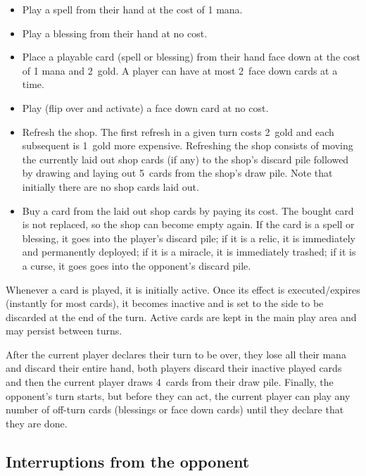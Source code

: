 \documentclass[dvipsnames,parskip,a4paper]{scrartcl}
\newcommand{\facedowncost}{2}
\newcommand{\refreshcost}{2}
\newcommand{\refreshcostincrease}{1}
\newcommand{\handsize}{4}
\newcommand{\facedownsize}{2}
\newcommand{\shopsize}{5}
\begin{document}
\begin{itemize}
\item Play a spell from their hand at the cost of 1 mana.
\item Play a blessing from their hand at no cost.
\item Place a playable card (spell or blessing) from their hand face down at the cost of 1 mana and \facedowncost \ gold. A player can have at most \facedownsize \ face down cards at a time.
\item Play (flip over and activate) a face down card at no cost.
\item Refresh the shop. The first refresh in a given turn costs \refreshcost \ gold and each subsequent is \refreshcostincrease \ gold more expensive.
Refreshing the shop consists of moving the currently laid out shop cards (if any) to the shop's discard pile followed by drawing and laying out \shopsize \ cards from the shop's draw pile. Note that initially there are no shop cards laid out.
\item Buy a card from the laid out shop cards by paying its cost.
The bought card is not replaced, so the shop can become empty again. If the card is a spell or blessing, it goes into the player's discard pile; if it is a relic, it is immediately and permanently deployed; if it is a miracle, it is immediately trashed; if it is a curse, it goes goes into the opponent's discard pile.
\end{itemize}

Whenever a card is played, it is initially active. Once its effect is executed/expires (instantly for most cards), it becomes inactive and is set to the side to be discarded at the end of the turn. Active cards are kept in the main play area and may persist between turns.

\vspace{4pt}

After the current player declares their turn to be over, they lose all their mana and discard their entire hand, both players discard their inactive played cards and then the current player draws \handsize \ cards from their draw pile. Finally, the opponent's turn starts, but before they can act, the current player can play any number of off-turn cards (blessings or face down cards) until they declare that they are done.

\subsection*{Interruptions from the opponent}
\end{document}
